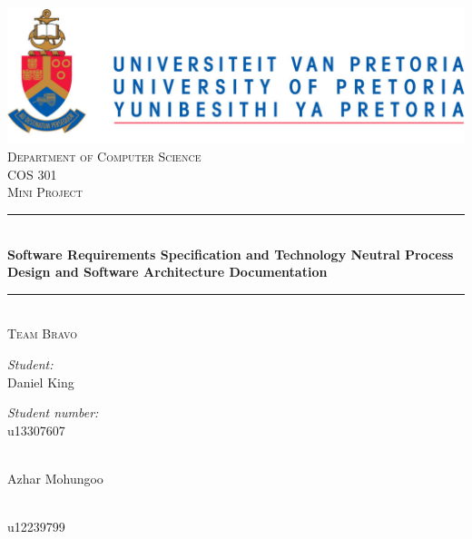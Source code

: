 \begin{titlepage}
	
	\begin{center}
		\includegraphics[width=1\textwidth]{../Diagrams/Images/University_of_Pretoria_Logo.PNG}\\[0.5cm]    
		\textsc{\LARGE Department of Computer Science}\\[0.5cm]
		\textsc{\Large COS 301}\\[0.5cm]
		\textsc{\Large Mini Project} \nocite{ref}\\[0.5cm]
		\rule{\linewidth}{0.5mm} \\[0.4cm]
		{ \huge \bfseries Software Requirements Specification and Technology Neutral Process Design and Software Architecture Documentation}\\[0.2cm]
		\rule{\linewidth}{0.5mm} \\[1cm]
		
		\textsc{\Large Team Bravo}\\[1cm]
		
		
		\begin{minipage}{0.4\textwidth}
			\begin{flushleft} \large
				\emph{Student:}\\[0.75cm]
				Daniel {King}
			\end{flushleft}
		\end{minipage}
		\begin{minipage}{0.4\textwidth}
			\begin{flushright} \large
				\emph{Student number:} \\[0.75cm]
				u13307607
			\end{flushright}
		\end{minipage}
		
		
		\begin{minipage}{0.4\textwidth}
			\begin{flushleft} \large
				\emph{} \\
				Azhar {Mohungoo }
			\end{flushleft}
		\end{minipage}
		\begin{minipage}{0.4\textwidth}
			\begin{flushright} \large
				\emph{} \\
				u12239799
			\end{flushright}
		\end{minipage}
		

\end{center}
\end{titlepage}
